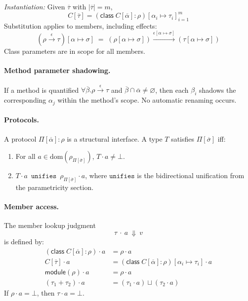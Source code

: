 \emph{Instantiation:} Given $\overline{\tau}$ with $|\overline{\tau}| = m$,
\[
C[\overline{\tau}] = (\mathsf{class}\;C[\overline{\alpha}] : \rho)[\alpha_i \mapsto \tau_i]_{i=1}^m
\]
Substitution applies to members, including effects:
\[
(\rho \xrightarrow{\epsilon} \tau)[\alpha \mapsto \sigma] \;=\; (\rho[\alpha \mapsto \sigma]) \xrightarrow{\epsilon[\alpha \mapsto \sigma]} (\tau[\alpha \mapsto \sigma])
\]
Class parameters are in scope for all members.

\paragraph{Method parameter shadowing.}
If a method is quantified $\forall\overline{\beta}.\rho \xrightarrow{\epsilon} \tau$ and $\overline{\beta} \cap \overline{\alpha} \neq \varnothing$, then each $\beta_i$ shadows the corresponding $\alpha_j$ within the method’s scope. No automatic renaming occurs.

\paragraph{Protocols.}
A protocol $\Pi[\overline{\alpha}]: \rho$ is a structural interface.
A type $T$ satisfies $\Pi[\overline{\sigma}]$ iff:
\begin{enumerate}
\item For all $a \in \mathrm{dom}(\rho_{\Pi[\overline{\sigma}]})$, $T \cdot a \neq \bot$.
\item $T \cdot a \ \mathrel{\texttt{unifies}} \ \rho_{\Pi[\overline{\sigma}]} \cdot a$,
  where $\texttt{unifies}$ is the bidirectional unification from the parametricity section.
\end{enumerate}

\paragraph{Member access.}
The member lookup judgment
\[
\tau \ \cdot\ a \ \Downarrow\ v
\]
is defined by:
\begin{align*}
(\mathsf{class}\;C[\overline{\alpha}] : \rho) \cdot a &= \rho \cdot a \\
C[\overline{\tau}] \cdot a &= (\mathsf{class}\;C[\overline{\alpha}]:\rho)[\alpha_i\mapsto\tau_i] \cdot a \\
\mathsf{module}(\rho) \cdot a &= \rho \cdot a \\
(\tau_1 + \tau_2) \cdot a &= (\tau_1 \cdot a) \sqcup (\tau_2 \cdot a)
\end{align*}
If $\rho \cdot a = \bot$, then $\tau \cdot a = \bot$.

